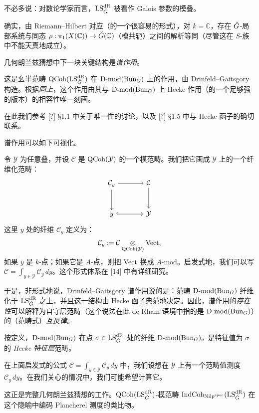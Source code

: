 \pnum{}不必多说：对数论学家而言，$\mathrm{LS}^{\mathrm{dR}}_{\check{G}}$ 被看作 Galois 参数的模叠。

确实，由 Riemann--Hilbert 对应（的一个很容易的形式），对 $k = \mathbb{C}$，存在 $\check{G}$-局部系统与同态 $\rho: \pi_1(X(\mathbb{C})) \to \check{G}(\mathbb{C})$（模共轭）之间的解析等同（尽管这在 $S$-族中不能天真地成立）。

\pnum{}几何朗兰兹猜想中下一块关键结构是\emph{谱作用}。

这是幺半范畴 $\mathrm{QCoh}(\mathrm{LS}^{\mathrm{dR}}_{\check{G}})$ 在 $\mathrm{D}\text{-}\mathrm{mod}(\mathrm{Bun}_G)$ 上的作用，由 Drinfeld--Gaitsgory 构造。根据\emph{同上}，这个作用由其与 $\mathrm{D}\text{-}\mathrm{mod}(\mathrm{Bun}_G)$ 上 Hecke 作用（的一个足够强的版本）的相容性唯一刻画。

在此我们参考 [?] §1.1 中关于唯一性的讨论，以及 [?] §1.5 中与 Hecke 函子的确切联系。%

\pnum{}谱作用可以如下可视化。

令 $\mathcal{Y}$ 为任意叠，并设 $\mathcal{C}$ 是 $\mathrm{QCoh}(\mathcal{Y})$ 的一个模范畴。我们把它画成 $\mathcal{Y}$ 上的一个纤维化范畴：
\begin{equation*}
\begin{tikzcd}[column sep=large, row sep=large]
  \mathcal{C}_y \arrow[r] \arrow[d] & \mathcal{C} \arrow[d] \\
  y \arrow[r, hook] & \mathcal{Y}
\end{tikzcd}
\end{equation*}
这里 $y$ 处的纤维 $\mathcal{C}_y$ 定义为：
\[
  \mathcal{C}_y := \mathcal{C} \underset{\mathrm{QCoh}(\mathcal{Y})}{\otimes} \mathrm{Vect},
\]
如果 $y$ 是 $k$-点；如果它是 $A$-点，则把 $\mathrm{Vect}$ 换成 $A$-$\mathrm{mod}$。启发式地，我们可以写 $\mathcal{C} = \int_{y \in \mathcal{Y}} \mathcal{C}_y \, dy$。这个形式体系在 [14] 中有详细研究。

于是，非形式地说，Drinfeld--Gaitsgory 谱作用说的是：范畴 $\mathrm{D}\text{-}\mathrm{mod}(\mathrm{Bun}_G)$ 纤维化于 $\mathrm{LS}^{\mathrm{dR}}_{\check{G}}$ 之上，并且这一结构由 Hecke 函子典范地决定。因此，谱作用的\emph{存在性}可以解释为自守层范畴（这个说法在此 de Rham 语境中指的是 $\mathrm{D}\text{-}\mathrm{mod}(\mathrm{Bun}_G)$）的（范畴式）\emph{互反律}。

按定义，$\mathrm{D}\text{-}\mathrm{mod}(\mathrm{Bun}_G)$ 在点 $\sigma \in \mathrm{LS}^{\mathrm{dR}}_{\check{G}}$ 处的纤维 $\mathrm{D}\text{-}\mathrm{mod}(\mathrm{Bun}_G)_\sigma$ 是特征值为 $\sigma$ 的 \emph{Hecke 特征层}范畴。

\pnum{}在上面启发式的公式 $\mathcal{C} = \int_{y \in \mathcal{Y}} \mathcal{C}_y \, dy$ 中，我们设想在 $\mathcal{Y}$ 上有一个范畴值测度 $\mathcal{C}_y \, dy$。在我们关心的情况中，我们可能希望计算它。

这正是完整几何朗兰兹猜想的工作。$\mathrm{QCoh}(\mathrm{LS}^{\mathrm{dR}}_{\check{G}})$-模范畴 $\mathrm{IndCoh}_{\mathrm{Nilp}^{\mathrm{spec}}}(\mathrm{LS}^{\mathrm{dR}}_{\check{G}})$ 在这个隐喻中编码 Plancherel 测度的类比物。

